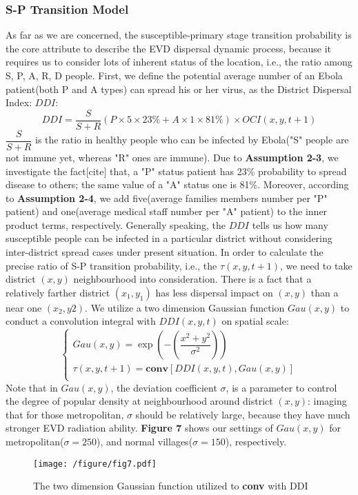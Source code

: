 \subsubsection{S-P Transition Model}
As far as we are concerned, the susceptible-primary stage transition probability is the core attribute to describe the EVD dispersal dynamic process, because it requires us to consider lots of inherent status of the location, i.e., the ratio among S, P, A, R, D people. First, we define the potential average number of an Ebola patient(both P and A types) can spread his or her virus, as the District Dispersal Index: $DDI$:
\begin{equation}
DDI=\dfrac {S}{S+R}\left({P}\times 5\times 23\% +{A}\times 1\times 81\% \right)\times OCI(x,y,t+1)
\end{equation}
$\dfrac {S}{S+R}$ is the ratio in healthy people who can be infected by Ebola("S" people are not immune yet, whereas "R" ones are immune). Due to \textbf{Assumption 2-3}, we investigate the fact[cite] that, a "P" status patient has 23\% probability to spread disease to others; the same value of a "A" status one is 81\%. Moreover, according to \textbf{Assumption 2-4}, we add five(average families members number per "P" patient) and one(average medical staff number per "A" patient) to the inner product terms, respectively. 
Generally speaking, the $DDI$ tells us how many susceptible people can be infected in a particular district without considering inter-district spread cases under present situation.
In order to calculate the precise ratio of S-P transition probability, i.e., the $\tau(x,y,t+1)$, we need to take district $(x,y)$ neighbourhood into consideration. There is a fact that a relatively farther district $(x_{1},y_{1})$ has less dispersal impact on $(x,y)$ than a near one $(x_{2},y{2})$. We utilize a two dimension Gaussian function $Gau(x,y)$ to conduct a convolution integral with $DDI(x,y,t)$ on spatial scale:
\begin{equation}
 \left\{
\begin{aligned}
Gau\left( x,y\right) =\exp\left(-\left( \dfrac {x^{2}+y^{2}}{\sigma ^{2}}\right)\right)\\
\tau \left( x,y,t+1\right) =\textbf{conv}\left[ DDI\left( x,y,t\right) ,Gau\left( x,y\right) \right]\\
\end{aligned}
\right.
\end{equation}
Note that in $Gau(x,y)$, the deviation coefficient $\sigma$, is a parameter to control the degree of popular density at neighbourhood around district $(x,y)$: imaging that for those metropolitan, $\sigma$ should be relatively large, because they have much stronger EVD radiation ability. \textbf{Figure 7} shows our settings of $Gau(x,y)$ for metropolitan($\sigma=250$), and normal villages($\sigma=150$), respectively.
\begin{figure}[htbp]
\centering
\texttt{[image: /figure/fig7.pdf]}
\caption{The two dimension Gaussian function utilized to \textbf{conv} with DDI}\label{fig:7}
\end{figure}


